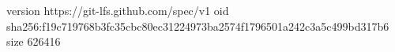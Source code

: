 version https://git-lfs.github.com/spec/v1
oid sha256:f19c719768b3fc35cbc80ec31224973ba2574f1796501a242c3a5c499bd317b6
size 626416
